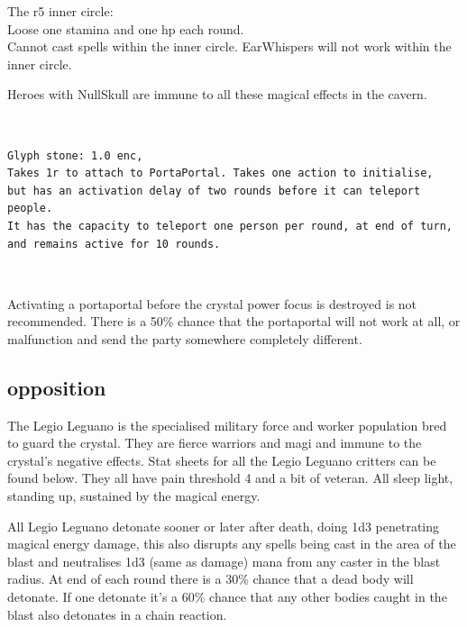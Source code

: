 The r5 inner circle:\\
Loose one stamina and one hp each round.\\
Cannot cast spells within the inner circle.
EarWhispers will not work within the inner circle.
\

\noindent
Heroes with NullSkull are immune to all these magical effects in the cavern.


\

\begin{samepage}
\small \begin{verbatim}
Glyph stone: 1.0 enc,
Takes 1r to attach to PortaPortal. Takes one action to initialise,
but has an activation delay of two rounds before it can teleport people.
It has the capacity to teleport one person per round, at end of turn,
and remains active for 10 rounds.
\end{verbatim} \normalsize
\end{samepage}

\

Activating a portaportal before the crystal power focus is destroyed is not recommended. There is a 50\% chance that the portaportal will not work at all, or malfunction and send the party somewhere completely different.







\subsection*{opposition}
The Legio Leguano is the specialised military force and worker population bred to guard the crystal. They are fierce warriors and magi and immune to the crystal's negative effects. Stat sheets for all the Legio Leguano critters can be found below. They all have pain threshold 4 and a bit of veteran. All sleep light, standing up, sustained by the magical energy.

All Legio Leguano detonate sooner or later after death, doing 1d3 penetrating magical energy damage, this also disrupts any spells being cast in the area of the blast and neutralises 1d3 (same as damage) mana from any caster in the blast radius. At end of each round there is a 30\% chance that a dead body will detonate. If one detonate it's a 60\% chance that any other bodies caught in the blast also detonates in a chain reaction.


